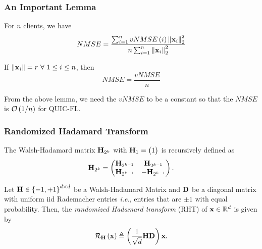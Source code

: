 \documentclass{beamer}
\begin{document}
    \begin{frame}
        \frametitle{An Important Lemma}
        \begin{lemma}
            \label{lem:vnmse-nmse-rel}
            For \(n\) clients, we have \cite{EDEN}
            \begin{equation}
                NMSE = \frac{\sum_{i=1}^nvNMSE\left(i\right)\left\lVert\boldsymbol{\mathbf{x}}_i\right\rVert_2^2}{n\sum_{i=1}^n\left\lVert\boldsymbol{\mathbf{x}}_i\right\rVert_2^2}
                \label{eq:vnmse-nmse-rel}
            \end{equation}
        \end{lemma}
        \begin{corollary}
            \label{cor:vnmse-nmse-ball}
            If \(\left\lVert\boldsymbol{\mathbf{x}}_i\right\rVert = r\ \forall\ 1 \le i \le n\), then
            \begin{equation}
                NMSE = \frac{vNMSE}{n}
                \label{eq:vnmse-nmse-ball}
            \end{equation}
        \end{corollary}
        From the above lemma, we need the \(vNMSE\) to be a constant so that the
        \(NMSE\) is \(\mathcal O\left(1/n\right)\) for QUIC-FL.
    \end{frame}

    \begin{frame}
        \frametitle{Randomized Hadamard Transform}
        \begin{definition}
            The Walsh-Hadamard matrix \(\boldsymbol{\mathbf{H}}_{2^k}\) with \(\boldsymbol{\mathbf{H}}_1 = 
            \begin{pmatrix}1\end{pmatrix}\) is recursively defined as
            \begin{equation}
                \boldsymbol{\mathbf{H}}_{2^k} = \begin{pmatrix}\boldsymbol{\mathbf{H}}_{2^{k-1}} & \boldsymbol{\mathbf{H}}_{2^{k-1}} \\ \boldsymbol{\mathbf{H}}_{2^{k-1}} & -\boldsymbol{\mathbf{H}}_{2^{k-1}}\end{pmatrix}.
                \label{eq:Hl-def}
            \end{equation}
        \end{definition}
        \begin{definition}
            Let \(\boldsymbol{\mathbf{H}}\in\left\{-1,+1\right\}^{d\times d}\) be a Walsh-Hadamard 
            Matrix and \(\boldsymbol{\mathbf{D}}\) be a diagonal matrix with uniform iid 
            Rademacher entries \emph{i.e.}, entries that are \(\pm 1\) with 
            equal probability. Then, the \emph{randomized Hadamard transform} 
            (RHT) of \(\boldsymbol{\mathbf{x}}\in\mathbb R^d\) is given by
            \begin{equation}
                \mathcal R_{\boldsymbol{\mathbf{H}}}\left(\boldsymbol{\mathbf{x}}\right) \triangleq \left(\frac{1}{\sqrt{d}}\boldsymbol{\mathbf{HD}}\right)\boldsymbol{\mathbf{x}}.
                \label{eq:rht-def}
            \end{equation}
        \end{definition}
    \end{frame}
\end{document}
